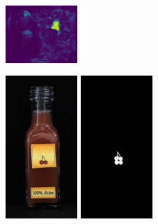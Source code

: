 \begin{figure}[H]
\begin{subfigure}[b]{\textwidth}
\begin{minipage}{0.45\textwidth}
            \includegraphics[width=0.3\textwidth]{figures/appendix/appendix_DRAEM/BB/226_mask.png}
        \end{minipage}
    \end{subfigure}
    \hfill
    \begin{subfigure}[b]{\textwidth}
        \centering
        \begin{minipage}{0.45\textwidth}
            \centering
            \includegraphics[width=0.3\textwidth]{figures/appendix/appendix_DRAEM/JB/139.png}
            \includegraphics[width=0.3\textwidth]{figures/appendix/appendix_DRAEM/JB/139_m.png}

\end{minipage}
\end{subfigure}
\end{figure}
